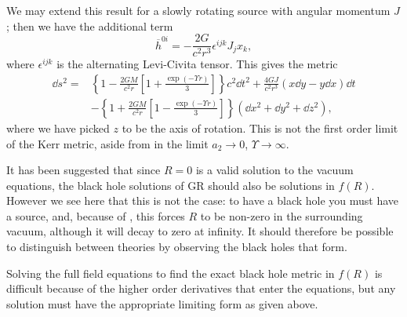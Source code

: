 We may extend this result for a slowly rotating source with angular momentum $J$; then we have the additional term\cite{Hobson2006}
\begin{equation}
\overline{h}^{0i} = -\frac{2G}{c^2r^3} \epsilon^{ijk}J_j x_k,
\end{equation}
where $\epsilon^{ijk}$ is the alternating Levi-Civita tensor. This gives the metric
\begin{align}
\dd s^2 = {} & \left\{1-\frac{2GM}{c^2r}\left[1 + \frac{\exp(- \Upsilon r)}{3}\right]\right\}c^2\dd t^2 + \frac{4GJ}{c^2r^3}\left(x\dd y - y\dd x\right)\dd t \nonumber \\ & - {} \left\{1 +\frac{2GM}{c^2r}\left[1 - \frac{\exp(- \Upsilon r)}{3}\right]\right\}\left(\dd x^2 + \dd y^2 + \dd z^2\right),
\end{align}
where we have picked $z$ to be the axis of rotation. This is not the first order limit of the Kerr metric, aside from in the limit $a_2 \rightarrow 0$, $\Upsilon \rightarrow \infty$.

It has been suggested that since $R = 0$ is a valid solution to the vacuum equations, the black hole solutions of GR should also be solutions in $f(R)$\cite{Psaltis2008, Barausse2008}. However we see here that this is not the case: to have a black hole you must have a source, and, because of , this forces $R$ to be non-zero in the surrounding vacuum, although it will decay to zero at infinity\cite{Olmo2007c}. It should therefore be possible to distinguish between theories by observing the black holes that form.

Solving the full field equations to find the exact black hole metric in $f(R)$ is difficult because of the higher order derivatives that enter the equations, but any solution must have the appropriate limiting form as given above.


